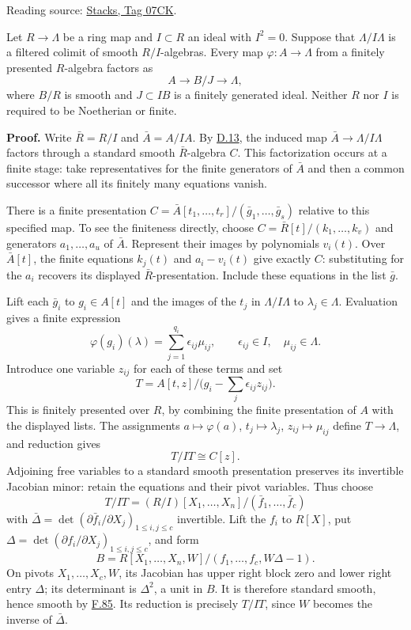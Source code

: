 \documentclass[11pt,a4paper,openany]{report}
\begin{document}
Reading source: \href{https://stacks.math.columbia.edu/tag/07CK}{Stacks, Tag 07CK}.

Let \(R\to\Lambda\) be a ring map and \(I\subset R\) an ideal with \(I^2=0\). Suppose that \(\Lambda/I\Lambda\) is a filtered colimit of smooth \(R/I\)-algebras. Every map \(\varphi:A\to\Lambda\) from a finitely presented \(R\)-algebra factors as \[A\longrightarrow B/J\longrightarrow\Lambda,\] where \(B/R\) is smooth and \(J\subset IB\) is a finitely generated ideal. Neither \(R\) nor \(I\) is required to be Noetherian or finite.

\textbf{Proof.} Write \(\bar R=R/I\) and \(\bar A=A/IA\). By \hyperref[AG-RG-S05-smoothing-lemma-colimit-standard-smooth]{D.13}, the induced map \(\bar A\to\Lambda/I\Lambda\) factors through a standard smooth \(\bar R\)-algebra \(C\). This factorization occurs at a finite stage: take representatives for the finite generators of \(\bar A\) and then a common successor where all its finitely many equations vanish.

There is a finite presentation \(C=\bar A[t_1,\ldots,t_r]/(\bar g_1,\ldots,\bar g_s)\) relative to this specified map. To see the finiteness directly, choose \(C=\bar R[t]/(k_1,\ldots,k_v)\) and generators \(a_1,\ldots,a_u\) of \(\bar A\). Represent their images by polynomials \(v_i(t)\). Over \(\bar A[t]\), the finite equations \(k_j(t)\) and \(a_i-v_i(t)\) give exactly \(C\): substituting for the \(a_i\) recovers its displayed \(\bar R\)-presentation. Include these equations in the list \(\bar g\).

Lift each \(\bar g_i\) to \(g_i\in A[t]\) and the images of the \(t_j\) in \(\Lambda/I\Lambda\) to \(\lambda_j\in\Lambda\). Evaluation gives a finite expression \[\varphi(g_i)(\lambda)=\sum_{j=1}^{q_i}\epsilon_{ij}\mu_{ij},\qquad \epsilon_{ij}\in I,\quad\mu_{ij}\in\Lambda.\] Introduce one variable \(z_{ij}\) for each of these terms and set \[T=A[t,z]/\bigl(g_i-\sum_j\epsilon_{ij}z_{ij}\bigr).\] This is finitely presented over \(R\), by combining the finite presentation of \(A\) with the displayed lists. The assignments \(a\mapsto\varphi(a)\), \(t_j\mapsto\lambda_j\), \(z_{ij}\mapsto\mu_{ij}\) define \(T\to\Lambda\), and reduction gives \[T/IT\cong C[z].\] Adjoining free variables to a standard smooth presentation preserves its invertible Jacobian minor: retain the equations and their pivot variables. Thus choose \[T/IT=(R/I)[X_1,\ldots,X_n]/(\bar f_1,\ldots,\bar f_c)\] with \(\bar\Delta=\det(\partial\bar f_i/\partial X_j)_{1\leq i,j\leq c}\) invertible. Lift the \(f_i\) to \(R[X]\), put \(\Delta=\det(\partial f_i/\partial X_j)_{1\leq i,j\leq c}\), and form \[B=R[X_1,\ldots,X_n,W]/(f_1,\ldots,f_c,W\Delta-1).\] On pivots \(X_1,\ldots,X_c,W\), its Jacobian has upper right block zero and lower right entry \(\Delta\); its determinant is \(\Delta^2\), a unit in \(B\). It is therefore standard smooth, hence smooth by \hyperref[AG-RG-S05-algebra-lemma-standard-smooth]{F.85}. Its reduction is precisely \(T/IT\), since \(W\) becomes the inverse of \(\bar\Delta\).
\end{document}
